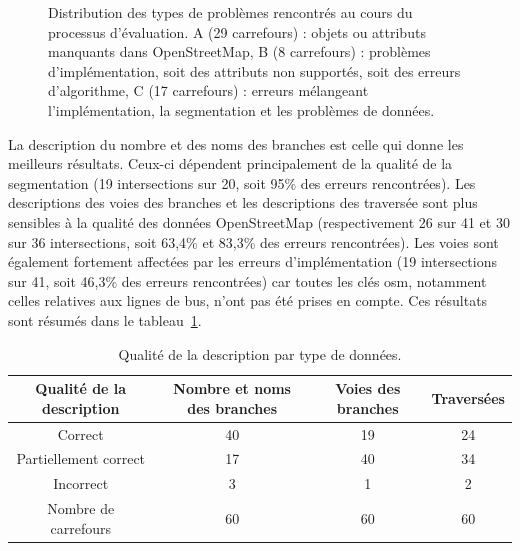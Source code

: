 \begin{figure}[ht]
    \centering
    \caption{Distribution des types de problèmes rencontrés au cours du processus d'évaluation. A (29 carrefours) : objets ou attributs manquants dans OpenStreetMap, B (8 carrefours) : problèmes d'implémentation, soit des attributs non supportés, soit des erreurs d'algorithme, C (17 carrefours) : erreurs mélangeant l'implémentation, la segmentation et les problèmes de données.}
    \label{fig:camissues}
\end{figure}

\newpar{}

La description du nombre et des noms des branches est celle qui donne les meilleurs résultats. Ceux-ci dépendent principalement de la qualité de la segmentation (19 intersections sur 20, soit 95\% des erreurs rencontrées). Les descriptions des voies des branches et les descriptions des traversée sont plus sensibles à la qualité des données OpenStreetMap (respectivement 26 sur 41 et 30 sur 36 intersections, soit 63,4\% et 83,3\% des erreurs rencontrées). Les voies sont également fortement affectées par les erreurs d'implémentation (19 intersections sur 41, soit 46,3\% des erreurs rencontrées) car toutes les clés \gls{osm}, notamment celles relatives aux lignes de bus, n'ont pas été prises en compte.  Ces résultats sont résumés dans le tableau~\ref{tab:descqualitybydesctype}.

\begin{table}[ht]
    \begin{center}
        \footnotesize
        \begin{tabular}{ c | c | c | c }
            Qualité de la description & Nombre et noms des branches & Voies des branches & Traversées\\
            \hline
            Correct & 40  & 19 & 24 \\
            Partiellement correct & 17 & 40 & 34 \\
            Incorrect & 3 & 1 & 2 \\
            \hline
            Nombre de carrefours & 60 & 60 & 60
        \end{tabular}
        \caption{Qualité de la description par type de données.}
        \label{tab:descqualitybydesctype}
    \end{center}
\end{table}

